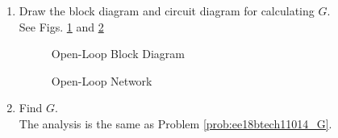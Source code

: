 \begin{enumerate}[label=\thesubsection.\arabic*.,ref=\thesubsection.\theenumi]
\item Draw the block diagram and circuit diagram for calculating $G$.\\
\solution  See Figs. 		\ref{fig:ee18btech11014_OpenLoop_Block}
 and \ref{fig:ee18btech11014_OpenLoop_Network}
%
\renewcommand{\thefigure}{\theenumi.\arabic{figure}}
\begin{figure}[ht!]
	\begin{center}
		\resizebox{\columnwidth}{!}{}
	\end{center}
	\caption{Open-Loop Block Diagram}
	\label{fig:ee18btech11014_OpenLoop_Block}
\end{figure}
\begin{figure}[ht!]
	\begin{center}
		\resizebox{\columnwidth}{!}{}
	\end{center}
	\caption{Open-Loop Network}
	\label{fig:ee18btech11014_OpenLoop_Network}
\end{figure}
\renewcommand{\thefigure}{\theenumi}
\item Find $G$.
\\
\solution The analysis is the same as Problem \ref{prob:ee18btech11014_G}.


%
%

\end{enumerate}

